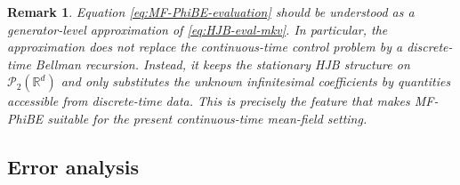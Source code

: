 \documentclass[a4paper, 10pt, english, reqno]{amsart}
\newtheorem{remark}[theorem]{Remark}
\begin{document}
\begin{remark}
    Equation \eqref{eq:MF-PhiBE-evaluation} should be understood as a
generator-level approximation of \eqref{eq:HJB-eval-mkv}. In
particular, the approximation does not replace the continuous-time control
problem by a discrete-time Bellman recursion. Instead, it keeps the
stationary HJB structure on $\mathcal P_2(\mathbb R^d)$ and only substitutes
the unknown infinitesimal coefficients by quantities accessible from
discrete-time data. This is precisely the feature that makes MF-PhiBE
suitable for the present continuous-time mean-field setting.
\end{remark}
 



\subsection{Error analysis}
\label{subsec:wellposedness-phibe}
\end{document}
